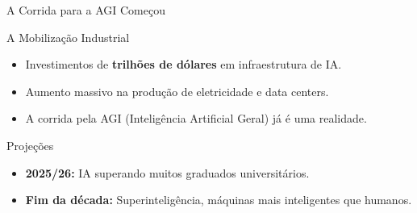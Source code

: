 \documentclass[aspectratio=169,12pt]{beamer}
\begin{document}
\begin{frame}{A Corrida para a AGI Começou}
    \begin{block}{A Mobilização Industrial}
        \begin{itemize}
            \item Investimentos de \textbf{trilhões de dólares} em infraestrutura de IA.
            \item Aumento massivo na produção de eletricidade e data centers.
            \item A corrida pela AGI (Inteligência Artificial Geral) já é uma realidade.
        \end{itemize}
    \end{block}
    
    \begin{alertblock}{Projeções}
        \begin{itemize}
            \item \textbf{2025/26:} IA superando muitos graduados universitários.
            \item \textbf{Fim da década:} Superinteligência, máquinas mais inteligentes que humanos.
        \end{itemize}
    \end{alertblock}
\end{frame}
\end{document}
